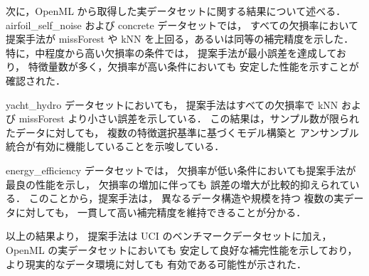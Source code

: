 次に，OpenML から取得した実データセットに関する結果について述べる．
airfoil\_self\_noise および concrete データセットでは，
すべての欠損率において提案手法が
missForest や kNN を上回る，あるいは同等の補完精度を示した．
特に，中程度から高い欠損率の条件では，
提案手法が最小誤差を達成しており，
特徴量数が多く，欠損率が高い条件においても
安定した性能を示すことが確認された．

yacht\_hydro データセットにおいても，
提案手法はすべての欠損率で
kNN および missForest より小さい誤差を示している．
この結果は，サンプル数が限られたデータに対しても，
複数の特徴選択基準に基づくモデル構築と
アンサンブル統合が有効に機能していることを示唆している．

energy\_efficiency データセットでは，
欠損率が低い条件においても提案手法が最良の性能を示し，
欠損率の増加に伴っても
誤差の増大が比較的抑えられている．
このことから，提案手法は，
異なるデータ構造や規模を持つ
複数の実データに対しても，
一貫して高い補完精度を維持できることが分かる．

以上の結果より，
提案手法は UCI のベンチマークデータセットに加え，
OpenML の実データセットにおいても
安定して良好な補完性能を示しており，
より現実的なデータ環境に対しても
有効である可能性が示された．






